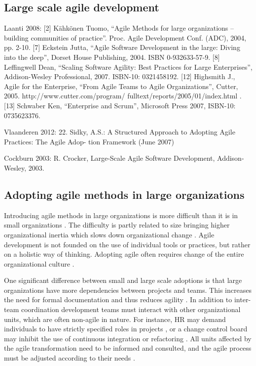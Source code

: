 \subsection{Large scale agile development}

Laanti 2008:
[2] Kähkönen Tuomo, “Agile Methods for large organizations – building communities of practice”.
Proc. Agile Development Conf. (ADC), 2004, pp. 2-10.
[7] Eckstein Jutta, “Agile Software Development in the large: Diving into the deep”,
Dorset House Publishing, 2004. ISBN 0-932633-57-9.
[8] Leffingwell Dean, “Scaling Software Agility: Best Practices for Large Enterprises”,
Addison-Wesley Professional, 2007. ISBN-10: 0321458192.
[12] Highsmith J., Agile for the Enterprise, “From Agile Teams to Agile Organizations”,
Cutter, 2005. http://www.cutter.com/program/ fulltext/reports/2005/01/index.html .
[13] Schwaber Ken, “Enterprise and Scrum”, Microsoft Press 2007, ISBN-10: 0735623376.

Vlaanderen 2012:
22. Sidky, A.S.: A Structured Approach to Adopting Agile Practices: The Agile Adop-
tion Framework (June 2007)

Cockburn 2003:
R. Crocker, Large-Scale Agile Software Development, Addison-Wesley, 2003.


\subsection{Adopting agile methods in large organizations}

Introducing agile methods in large organizations is more difficult than it is in
small organizations \cite{Dyba2008}. The difficulty is partly related to size
bringing higher organizational inertia which slows down organizational change
\cite{Livermore2008}. Agile development is not founded on the use of individual
tools or practices, but rather on a holistic way of thinking. Adopting agile
often requires change of the entire organizational culture \cite{Misra2010}.

One significant difference between small and large scale adoptions is that large
organizations have more dependencies between projects and teams. This increases
the need for formal documentation and thus reduces agility \cite{Lindvall2004}.
In addition to inter-team coordination development teams must interact with
other organizational units, which are often non-agile in nature. For instance,
HR may demand individuals to have strictly specified roles in projects
\cite{Boehm2005}, or a change control board may inhibit the use of continuous
integration or refactoring \cite{Lindvall2004}. All units affected by the agile
transformation need to be informed and consulted, and the agile process must be
adjusted according to their needs \cite{Lindvall2004, Cohn2003, Boehm2005}.

